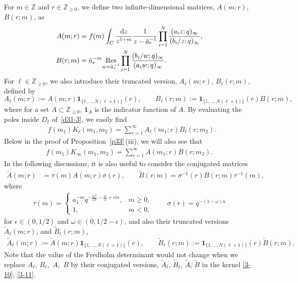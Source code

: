 \documentclass[pdftex]{sigma}
\numberwithin{equation}{section}
\def\e{\epsilon}
\def\i{\infty}
\def\o{\omega}
\def\t{\tau}
\def\Z{\mathbb{Z}}
\begin{document}
For $m\in\Z$ and $r\in\Z_{\ge 0}$,
we define two infinite-dimensional matrices,
$A(m;r)$, $B(r;m)$, as
\begin{align}
 \label{3-15d}
 A(m;r)&=f(m)\int_C\frac{{\rm d}z}{z^{1+m}}
 \frac{1}{z-\tilde{a}_{r}^{-1}}
 \prod_{i=1}^N\frac{(a_i z;q)_{\i}}{(b_i/z;q)_{\i}},
 \\
 \label{3-16d}
 B(r;m)&=\tilde{a}_{r}^{-m}
 \underset{w=\tilde{a}_{r}^{-1}}{\text{Res}}
 \prod_{i=1}^N\frac{(b_i/w;q)_{\i}}{(a_i w;q)_{\i}}.
\end{align}
For $\ell\in\Z_{\ge 0}$, we also introduce their truncated version, $A_{\ell}(m;r)$, $B_{\ell}(r;m)$, defined by
\[%
 A_{\ell}(m;r):=A(m;r) \mathbf{1}_{\{1,\dots, N(\ell+1)\}}(r),\qquad
 B_{\ell}(r;m):= \mathbf{1}_{\{1,\dots, N(\ell+1)\}}(r)B(r;m),
\]
where for a set $A\subset\Z_{\ge0}$, $\mathbf{1}_A$ is the indicator function of $A$. By evaluating the poles inside $D_\ell$ of~\eqref{d31-3}, we easily find
\begin{align}
\label{3-10}
 &f(m_1)K_{\ell}(m_1,m_2)=\sum_{r=1}^{\infty}A_{\ell}(m_1;r)B_{\ell}(r;m_2).
\end{align}
Below in the proof of Proposition~\ref{p33}\,(iii), we will also see that
\begin{align}
\label{3-11}
 f(m_1)K_{\infty}(m_1,m_2)=\sum_{r=1}^{\i}A(m_1;r)B(r;m_2).
\end{align}
In the following discussions, it is also useful to consider the conjugated matrices
\begin{align}
 \label{3-16dd}
 \tilde{A}(m;r)&=\t(m) A(m;r)\sigma(r),
 \qquad
 \tilde{B}(r;m)=\sigma^{-1}(r) B(r;m)\t^{-1}(m),
\end{align}
where
\begin{align}
\label{3-12d}
 \t(m)=
 \begin{cases}
 a_{1}^{-m} q^{-\frac{m^2}{2N}-\frac{m}{2}+\e m},
 & m\ge 0,\\
 1,& m<0,
 \end{cases}
 \qquad
 \sigma(r)= q^{-(1-\omega)u}
\end{align}
for $\e\in(0,1/2)$ and $\o\in(0,1/2-\e)$, and also
their truncated versions $\tilde{A}_{\ell}(m;r)$, and
$\tilde{B}_{\ell}(r;m)$,
\begin{align}
\label{3-15at}
 \tilde{A}_{\ell}(m;r):=\tilde{A}(m;r) \mathbf{1}_{\{1,\dots, N(\ell+1)\}}(r),\qquad
 \tilde{B}_{\ell}(r;m):= \mathbf{1}_{\{1,\dots, N(\ell+1)\}}(r)\tilde{B}(r;m).
\end{align}
Note that the value of the
Fredholm determinant would not change when we replace
$A_\ell$, $B_\ell$,~$A$,~$B$ by their conjugated versions,
$\tilde{A}_\ell$, $\tilde{B}_\ell$, $\tilde{A}$, $\tilde{B}$
in the kernel \eqref{3-10}, \eqref{3-11}.
\end{document}
